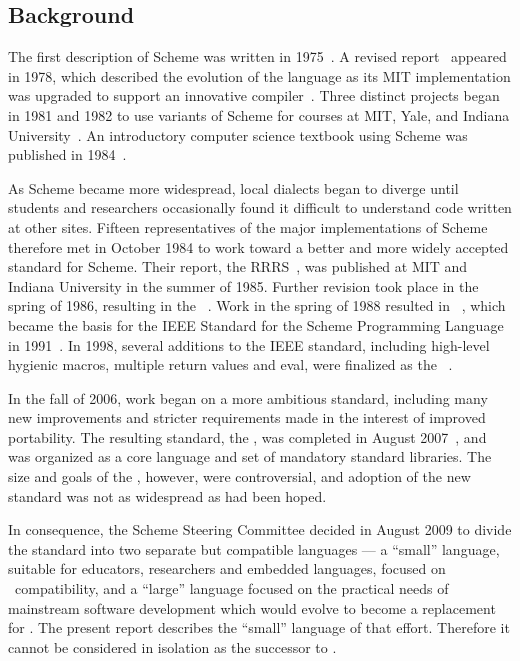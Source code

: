 \subsection*{Background}

\vest The first description of Scheme was written in
1975~\cite{Scheme75}.  A revised report~\cite{Scheme78}
appeared in 1978, which described the evolution
of the language as its MIT implementation was upgraded to support an
innovative compiler~\cite{Rabbit}.  Three distinct projects began in
1981 and 1982 to use variants of Scheme for courses at MIT, Yale, and
Indiana University~\cite{Rees82,MITScheme,Scheme311}.  An introductory
computer science textbook using Scheme was published in
1984~\cite{SICP}.

\vest As Scheme became more widespread,
local dialects began to diverge until students and researchers
occasionally found it difficult to understand code written at other
sites.
Fifteen representatives of the major implementations of Scheme therefore
met in October 1984 to work toward a better and more widely accepted
standard for Scheme.
Their report, the RRRS~\cite{RRRS},
was published at MIT and Indiana University in the summer of 1985.
Further revision took place in the spring of 1986, resulting in the
\rthreers~\cite{R3RS}.
Work in the spring of 1988 resulted in \rfourrs~\cite{R4RS},
which became the basis for the
IEEE Standard for the Scheme Programming Language in 1991~\cite{IEEEScheme}.
In 1998, several additions to the IEEE standard, including high-level
hygienic macros, multiple return values and {\cf eval}, were finalized
as the \rfivers~\cite{R5RS}.


In the fall of 2006, work began on a more ambitious standard,
including many new improvements and stricter requirements made in the
interest of improved portability.  The resulting standard, the
\rsixrs, was completed in August 2007~\cite{R6RS}, and was organized
as a core language and set of mandatory standard libraries.  The size and goals
of the \rsixrs, however, were controversial, and adoption of the new
standard was not as widespread as had been hoped.

In consequence, the Scheme Steering Committee decided in August 2009 to divide the
standard into two separate but compatible languages --- a ``small''
language, suitable for educators, researchers and embedded languages,
focused on \rfivers~compatibility, and a ``large'' language focused
on the practical needs of mainstream software development
which would evolve to become a replacement for \rsixrs.
The present report describes the ``small'' language of that effort.
Therefore it cannot be considered in isolation as the successor
to \rsixrs.



